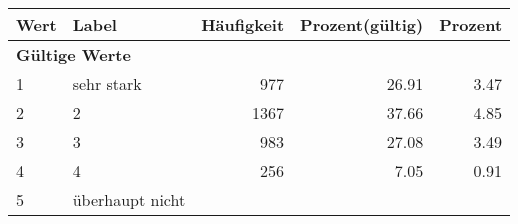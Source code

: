      \begin{longtable}{lXrrr}
     \toprule
     \textbf{Wert} & \textbf{Label} & \textbf{Häufigkeit} & \textbf{Prozent(gültig)} & \textbf{Prozent} \\
     \endhead
     \midrule
     \multicolumn{5}{l}{\textbf{Gültige Werte}}\\

     1 &
     \multicolumn{1}{X}{ sehr stark   } &


       \num{977} &
       \num[round-mode=places,round-precision=2]{26,91} &
         \num[round-mode=places,round-precision=2]{3,47} \\

     2 &
     \multicolumn{1}{X}{ 2   } &


       \num{1367} &
       \num[round-mode=places,round-precision=2]{37,66} &
         \num[round-mode=places,round-precision=2]{4,85} \\

     3 &
     \multicolumn{1}{X}{ 3   } &


       \num{983} &
       \num[round-mode=places,round-precision=2]{27,08} &
         \num[round-mode=places,round-precision=2]{3,49} \\

     4 &
     \multicolumn{1}{X}{ 4   } &


       \num{256} &
       \num[round-mode=places,round-precision=2]{7,05} &
         \num[round-mode=places,round-precision=2]{0,91} \\

     5 &
     \multicolumn{1}{X}{ überhaupt nicht   } &



\end{longtable}
